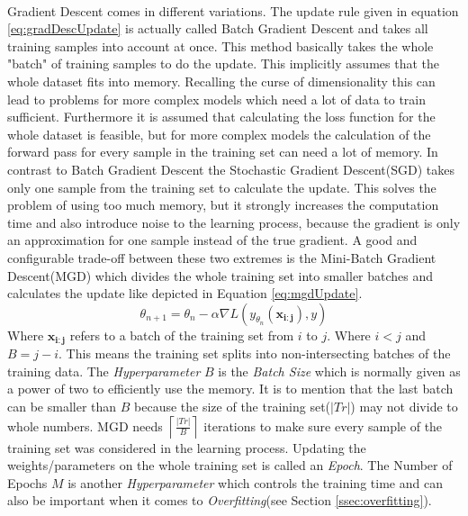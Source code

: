 \paragraph{} %
Gradient Descent comes in different variations.
The update rule given in equation \ref{eq:gradDescUpdate} is actually called Batch Gradient Descent and takes all training samples into account at once. 
This method basically takes the whole "batch" of training samples to do the update. 
This implicitly assumes that the whole dataset fits into memory. 
Recalling the curse of dimensionality this can lead to problems for more complex models which need a lot of data to train sufficient.
Furthermore it is assumed that calculating the loss function for the whole dataset is feasible, but for more complex models the calculation of the forward pass for every sample in the training set can need a lot of memory. 
In contrast to Batch Gradient Descent the Stochastic Gradient Descent(SGD) takes only one sample from the training set to calculate the update. 
This solves the problem of using too much memory, but it strongly increases the computation time and also introduce noise to the learning process, because the gradient is only an approximation for one sample instead of the true gradient. 
A good and configurable trade-off between these two extremes is the Mini-Batch Gradient Descent(MGD) which divides the whole training set into smaller batches and calculates the update like depicted in Equation \ref{eq:mgdUpdate}.
\begin{equation}\label{eq:mgdUpdate}
\theta_{n+1} = \theta_n - \alpha \nabla L(y_{\theta_n}(\mathbf{x_{i:j}}), y)
\end{equation}
Where $\mathbf{x_{i:j}}$ refers to a batch of the training set from $i$ to $j$. Where $i < j$ and $B = j - i$. 
This means the training set splits into non-intersecting batches of the training data.
The \emph{Hyperparameter} $B$ is the \emph{Batch Size} which is normally given as a power of two to efficiently use the memory.
It is to mention that the last batch can be smaller than $B$ because the size of the training set($|Tr|$) may not divide to whole numbers.
MGD needs $\left \lceil \frac{|Tr|}{B} \right \rceil$ iterations to make sure every sample of the training set was considered in the learning process. 
Updating the weights/parameters on the whole training set is called an \emph{Epoch}.
The Number of Epochs $M$ is another \emph{Hyperparameter} which controls the training time and can also be important when it comes to \emph{Overfitting}(see Section \ref{ssec:overfitting}).

